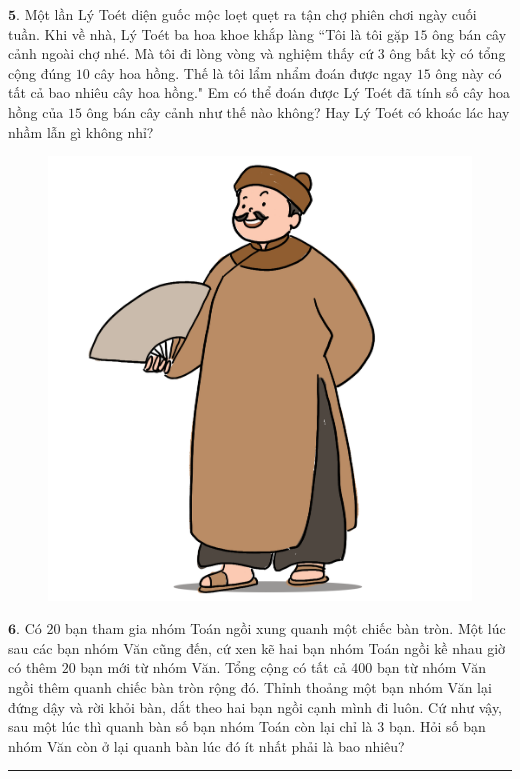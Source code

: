 \begin{multicols}{2}
\begin{figure}[H]
	\end{figure}
	$\pmb{5.}$ Một lần Lý Toét diện guốc mộc loẹt quẹt ra tận chợ phiên chơi ngày cuối tuần. Khi về nhà, Lý Toét ba hoa khoe khắp làng ``Tôi là tôi gặp $15$ ông bán cây cảnh ngoài chợ nhé. Mà tôi đi lòng vòng và nghiệm thấy cứ $3$ ông bất kỳ có tổng cộng đúng $10$ cây hoa hồng. Thế là tôi lẩm nhẩm đoán được ngay $15$ ông này có tất cả bao nhiêu cây hoa hồng."
	\vskip 0.1cm
	Em có thể đoán được Lý Toét đã tính số cây hoa hồng của $15$ ông bán cây cảnh như thế nào không? Hay Lý Toét có khoác lác hay nhầm lẫn gì không nhỉ?
	\begin{figure}[H]
		\centering
		\captionsetup{labelformat= empty, justification=centering}
		\includegraphics[width=0.58\linewidth]{Pi12_Bai5}
		\vspace*{-15pt}
	\end{figure}
	$\pmb{6.}$ Có $20$ bạn tham gia nhóm Toán ngồi xung quanh một chiếc bàn tròn. Một lúc sau các bạn nhóm Văn cũng đến, cứ xen kẽ hai bạn nhóm Toán ngồi kề nhau giờ có thêm $20$ bạn mới từ nhóm Văn. Tổng cộng có tất cả $400$ bạn từ nhóm Văn ngồi thêm quanh chiếc bàn tròn rộng đó. Thỉnh thoảng một bạn nhóm Văn lại đứng dậy và rời khỏi bàn, dắt theo hai bạn ngồi cạnh mình đi luôn. Cứ như vậy, sau một lúc thì quanh bàn số bạn nhóm Toán còn lại chỉ là $3$ bạn. Hỏi số bạn nhóm Văn còn ở lại quanh bàn lúc đó ít nhất phải là bao nhiêu?
\end{multicols}
\vspace*{-12pt}
\rule{1\linewidth}{0.1pt}
\begingroup
